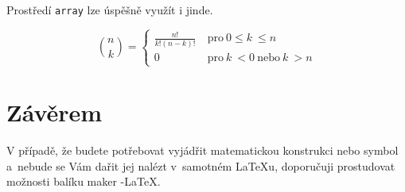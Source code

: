 \documentclass[a4paper, 11pt, twocolumn]{article}
\theoremstyle{plain}
\theoremstyle{plain}
\begin{document}
Prostředí \verb|array| lze úspěšně využít i jinde.

$$
\binom{n}{k} =
\left\{
\begin{array}{ll}
\frac{n!}{k!(n-k)!} &\ \text{pro}\ 0 \leq k\ \leq n\\
0 &\ \text{pro}\ k\ <0\ \text{nebo}\ k\ >n
\end{array}
\right.
$$

\section{Závěrem}
V případě, že budete potřebovat vyjádřit matematickou konstrukci nebo symbol a~nebude se Vám dařit jej nalézt v~samotném \LaTeX u, doporučuji prostudovat možnosti balíku maker \AmS-\LaTeX.
\end{document}
